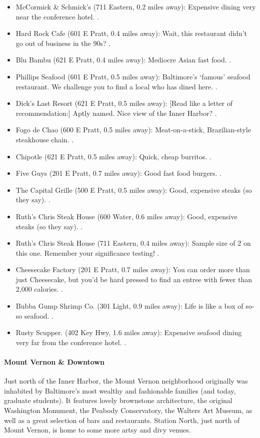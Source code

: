 \begin{itemize}
\item{McCormick \& Schmick's (711 Eastern, 0.2 miles away): Expensive dining very near the conference hotel. \professor.}
\item{Hard Rock Cafe (601 E Pratt, 0.4 miles away): Wait, this restaurant didn't go out of business in the 90s? \postdoc.}
\item{Blu Bambu (621 E Pratt, 0.4 miles away): Mediocre Asian fast food. \postdoc.}
\item{Phillips Seafood (601 E Pratt, 0.5 miles away): Baltimore's `famous' seafood restaurant. We challenge you to find a local who has dined here. \professor.}
\item{Dick's Last Resort (621 E Pratt, 0.5 miles away): [Read like a letter of recommendation:] Aptly named. Nice view of the Inner Harbor? \postdoc.}
\item{Fogo de Chao (600 E Pratt, 0.5 miles away): Meat-on-a-stick, Brazilian-style steakhouse chain. \professor.}
\item{Chipotle (621 E Pratt, 0.5 miles away): Quick, cheap burritos. \gradstudent.}
\item{Five Guys (201 E Pratt, 0.7 miles away): Good fast food burgers. \gradstudent.}
\item{The Capital Grille (500 E Pratt, 0.5 miles away): Good, expensive steaks (so they say). \industry.}
\item{Ruth's Chris Steak House (600 Water, 0.6 miles away): Good, expensive steaks (so they say). \industry.}
\item{Ruth's Chris Steak House (711 Eastern, 0.4 miles away): Sample size of 2 on this one. Remember your significance testing! \industry.}
\item{Cheesecake Factory (201 E Pratt, 0.7 miles away): You can order more than just Cheesecake, but you'd be hard pressed to find an entree with fewer than 2,000 calories. \postdoc.}
\item{Bubba Gump Shrimp Co. (301 Light, 0.9 miles away): Life is like a box of so-so seafood. \postdoc.}
\item{Rusty Scupper. (402 Key Hwy, 1.6 miles away): Expensive seafood dining very far from the conference hotel. \professor.}
\end{itemize}


\paragraph*{Mount Vernon \& Downtown} 
Just north of the Inner Harbor, the Mount Vernon neighborhood originally was inhabited by Baltimore's most wealthy and fashionable families (and today, graduate students). It features lovely brownstone architecture, the original Washington Monument, the Peabody Conservatory, the Walters Art Museum, as well as a great selection of bars and restaurants. Station North, just north of Mount Vernon, is home to some more artsy and divy venues.

